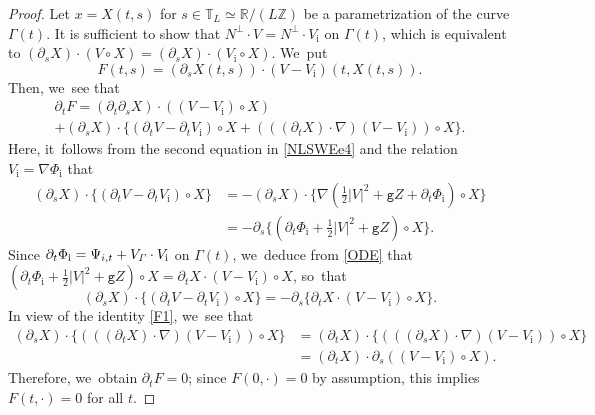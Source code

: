 \documentclass[11pt]{article}
\newcommand{\gr}{{\mathtt g}}
\newcommand{\R}{{\mathbb R}}
\newcommand{\dt}{\partial_t}
\newcommand{\itGamma}{\mathit{\Gamma}}
\theoremstyle{definition}
\begin{document}
\begin{proof}
Let $x=X(t,s)$ for $s\in\mathbb{T}_L\simeq\R/(L\mathbb{Z})$ be a parametrization of the curve $\itGamma(t)$.
It is sufficient to show that $N^\perp\cdot V=N^\perp\cdot V_\mathrm{i}$ on $\itGamma(t)$, which is equivalent to
$(\partial_s X)\cdot(V\circ X)=(\partial_s X)\cdot(V_\mathrm{i}\circ X)$. We~put
\[
F(t,s)=(\partial_s X(t,s))\cdot(V-V_\mathrm{i})(t,X(t,s)).
\]
Then, we~see that
\begin{multline*}
\dt F= (\dt\partial_s X)\cdot ((V-V_\mathrm{i})\circ X) \\
+ (\partial_s X)\cdot\{ (\dt V-\dt V_\mathrm{i})\circ X + (((\dt X)\cdot\nabla)(V-V_\mathrm{i}))\circ X \}.
\end{multline*}
Here, it~follows from the second equation in \eqref{NLSWEe4} and the relation $V_\mathrm{i}=\nabla\Phi_\mathrm{i}$ that
\begin{align*}
(\partial_s X)\cdot \{ (\dt V-\dt V_\mathrm{i})\circ X \}
&= - (\partial_s X)\cdot \{ \nabla(\tfrac12|V|^2+\gr Z+\dt\Phi_\mathrm{i})\circ X \} \\
&= - \partial_s \{ (\dt\Phi_\mathrm{i}+\tfrac12|V|^2+\gr Z)\circ X \}.
\end{align*}
Since $\dt \Phi_\mathrm{i}=\Psi_{{\rm i},t}+V_{\itGamma}\cdot V_\mathrm{i}$ on $\itGamma(t)$, we~deduce from \eqref{ODE} that $(\dt\Phi_\mathrm{i}+\tfrac12|V|^2+\gr Z)\circ X=\partial_t X\cdot(V-V_\mathrm{i})\circ X$, so~that
\[
(\partial_s X)\cdot \{ (\dt V-\dt V_\mathrm{i})\circ X \}= - \partial_s \{ \partial_t X\cdot(V-V_\mathrm{i})\circ X\}.
\]
In view of the identity \eqref{F1}, we~see that
\begin{align*}
(\partial_s X)\cdot\{ (((\dt X)\cdot\nabla)(V-V_\mathrm{i}))\circ X \}
&= (\dt X)\cdot\{ (((\partial_s X)\cdot\nabla)(V-V_\mathrm{i}))\circ X \} \\
&= (\dt X)\cdot \partial_s((V-V_\mathrm{i})\circ X).
\end{align*}
Therefore, we~obtain $\dt F=0$; since $F(0,\cdot)=0$ by assumption, this implies $F(t,\cdot)=0$ for all $t$.
\end{proof}
\end{document}

